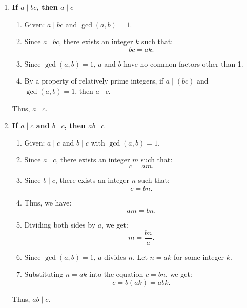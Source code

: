 \documentclass{article}
\begin{document}
\begin{enumerate}
    \item \textbf{If \( a \mid bc \), then \( a \mid c \)}

    \begin{enumerate}
        \item Given: \( a \mid bc \) and \( \gcd(a, b) = 1 \).
        \item Since \( a \mid bc \), there exists an integer \( k \) such that:
        \[
        bc = ak.
        \]
        \item Since \( \gcd(a, b) = 1 \), \( a \) and \( b \) have no common factors other than 1.
        \item By a property of relatively prime integers, if \( a \mid (bc) \) and \( \gcd(a, b) = 1 \), then \( a \mid c \).
    \end{enumerate}
    Thus, \( a \mid c \).

    \item \textbf{If \( a \mid c \) and \( b \mid c \), then \( ab \mid c \)}

    \begin{enumerate}
        \item Given: \( a \mid c \) and \( b \mid c \) with \( \gcd(a, b) = 1 \).
        \item Since \( a \mid c \), there exists an integer \( m \) such that:
        \[
        c = am.
        \]
        \item Since \( b \mid c \), there exists an integer \( n \) such that:
        \[
        c = bn.
        \]
        \item Thus, we have:
        \[
        am = bn.
        \]
        \item Dividing both sides by \( a \), we get:
        \[
        m = \frac{bn}{a}.
        \]
        \item Since \( \gcd(a, b) = 1 \), \( a \) divides \( n \). Let \( n = ak \) for some integer \( k \).
        \item Substituting \( n = ak \) into the equation \( c = bn \), we get:
        \[
        c = b(ak) = abk.
        \]
    \end{enumerate}
    Thus, \( ab \mid c \).
\end{enumerate}
\end{document}
